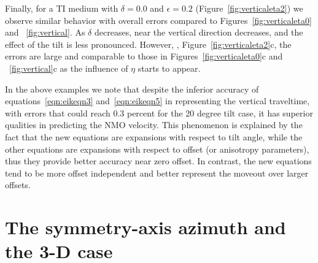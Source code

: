 Finally, for a TI medium with $\delta=0.0$ and $\epsilon=0.2$
(Figure~\ref{fig:verticaleta2}) we observe
similar behavior with   overall  errors compared to
Figures~\ref{fig:verticaleta0} and ~\ref{fig:vertical}. As $\delta$
decreases,  near the vertical direction decreases, and the effect of the
tilt is less pronounced. However, ,
Figure~\ref{fig:verticaleta2}c, the errors are large and comparable
to those in Figures~\ref{fig:verticaleta0}c and ~\ref{fig:vertical}c as the influence
of $\eta$ starts to appear.

In the above examples we note that despite the inferior accuracy of
equations~\ref{eqn:eikeqn3} and~\ref{eqn:eikeqn5} in representing
the vertical traveltime, with  errors that could reach 0.3
percent for the 20 degree tilt case, it has superior qualities in
predicting the NMO velocity. This phenomenon is
explained by the fact that the new equations are expansions with
respect to tilt angle, while the other equations are expansions with respect
to offset (or anisotropy parameters), thus they provide better accuracy near zero offset. In contrast,
the new equations tend to be more offset independent and better
represent the moveout over larger offsets.


\section{The symmetry-axis azimuth and the 3-D case}

